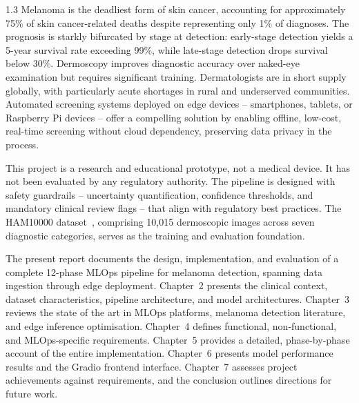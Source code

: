 \begin{spacing}{1.3}
Melanoma is the deadliest form of skin cancer, accounting for approximately 75\% of skin cancer-related deaths despite representing only 1\% of diagnoses. The prognosis is starkly bifurcated by stage at detection: early-stage detection yields a 5-year survival rate exceeding 99\%, while late-stage detection drops survival below 30\%. Dermoscopy improves diagnostic accuracy over naked-eye examination but requires significant training. Dermatologists are in short supply globally, with particularly acute shortages in rural and underserved communities. Automated screening systems deployed on edge devices -- smartphones, tablets, or Raspberry Pi devices -- offer a compelling solution by enabling offline, low-cost, real-time screening without cloud dependency, preserving data privacy in the process.

This project is a research and educational prototype, not a medical device. It has not been evaluated by any regulatory authority. The pipeline is designed with safety guardrails -- uncertainty quantification, confidence thresholds, and mandatory clinical review flags -- that align with regulatory best practices. The HAM10000 dataset~\cite{tschandl2018}, comprising 10,015 dermoscopic images across seven diagnostic categories, serves as the training and evaluation foundation.

The present report documents the design, implementation, and evaluation of a complete 12-phase MLOps pipeline for melanoma detection, spanning data ingestion through edge deployment. Chapter~2 presents the clinical context, dataset characteristics, pipeline architecture, and model architectures. Chapter~3 reviews the state of the art in MLOps platforms, melanoma detection literature, and edge inference optimisation. Chapter~4 defines functional, non-functional, and MLOps-specific requirements. Chapter~5 provides a detailed, phase-by-phase account of the entire implementation. Chapter~6 presents model performance results and the Gradio frontend interface. Chapter~7 assesses project achievements against requirements, and the conclusion outlines directions for future work.

\end{spacing}
